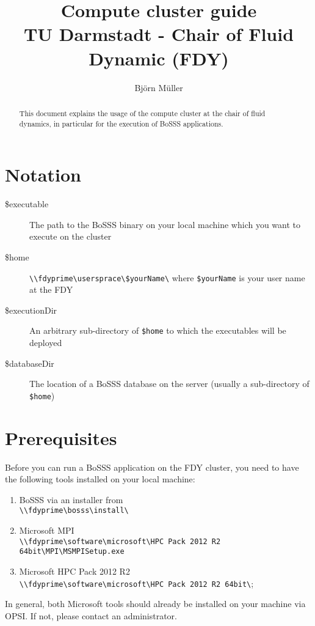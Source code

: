 \documentclass[11pt,twoside,a4paper]{fdyartcl}
\title{Compute cluster guide\\TU Darmstadt - Chair of Fluid Dynamic (FDY)}
\author{Björn Müller}
\theoremstyle{myPlain}
\theoremstyle{myDefinition}
\begin{document}


\maketitle


\begin{abstract}
This document explains the usage of the compute cluster at the chair of fluid dynamics, in particular for the execution of BoSSS applications.
\end{abstract}


\section{Notation}

\begin{description}
	\item[\$executable] The path to the BoSSS binary on your local machine  
	  which you want to  execute on the cluster
	\item[\$home] \verb|\\fdyprime\usersprace\$yourName\| where
		\verb|$yourName| is your user name at the FDY
	\item[\$executionDir] An arbitrary sub-directory of \verb|$home| to 
		which the executables will be deployed
	\item[\$databaseDir] The location of a BoSSS database on the server
		(usually a sub-directory of \verb|$home|)
\end{description}


\section{Prerequisites}

Before you can run a BoSSS application on the FDY cluster, you need to have the following tools installed on your local machine:
\begin{enumerate}
	\item BoSSS via an installer from
		\\ \verb|\\fdyprime\bosss\install\|
	\item Microsoft MPI
		\\ \verb|\\fdyprime\software\microsoft\HPC Pack 2012 R2 64bit\MPI\MSMPISetup.exe|
	\item Microsoft HPC Pack 2012 R2
		\\ \verb|\\fdyprime\software\microsoft\HPC Pack 2012 R2 64bit\|;
\end{enumerate}
In general, both Microsoft tools should already be installed on your machine via OPSI. If not, please contact an administrator.
\end{document}
